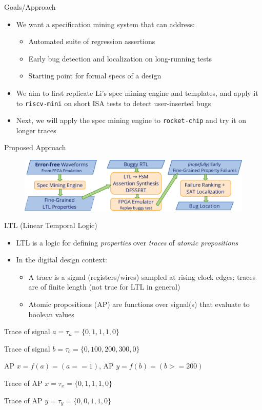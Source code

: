 \documentclass[12pt,aspectratio=169]{beamer}
\begin{document}
\begin{frame}{Goals/Approach}
  \begin{itemize}
    \setlength\itemsep{0.75em}
    \item We want a specification mining system that can address:
      \begin{itemize}
        \item Automated suite of regression assertions
        \item Early bug detection and localization on long-running tests
        \item Starting point for formal specs of a design
      \end{itemize}
    \item We aim to first replicate Li's spec mining engine and templates, and apply it to \texttt{riscv-mini} on short ISA tests to detect user-inserted bugs
    \item Next, we will apply the spec mining engine to \texttt{rocket-chip} and try it on longer traces
  \end{itemize}
\end{frame}

\begin{frame}{Proposed Approach}
  \begin{figure}
    \includegraphics[width=\textwidth]{proposed_approach.pdf}
  \end{figure}
\end{frame}

\begin{frame}{LTL (Linear Temporal Logic)}
  \begin{itemize}
    \item {\small LTL is a logic for defining \textit{properties} over \textit{traces} of \textit{atomic propositions}}
    \item {\small In the digital design context:}
    \begin{itemize}
      \item {\footnotesize A trace is a signal (registers/wires) sampled at rising clock edges; traces are of finite length (not true for LTL in general)}
      \item {\footnotesize Atomic propositions (AP) are functions over signal(s) that evaluate to boolean values}
    \end{itemize}
  \end{itemize}
  {\footnotesize
  Trace of signal $a = \tau_a = \{0, 1, 1, 1, 0\}$

  Trace of signal $b = \tau_b = \{0, 100, 200, 300, 0\}$

  AP $x = f(a) = (a == 1)$, AP $y = f(b) = (b >= 200)$

  Trace of AP $x = \tau_x = \{0, 1, 1, 1, 0\}$

  Trace of AP $y = \tau_y = \{0, 0, 1, 1, 0\}$
  }
\end{frame}
\end{document}
